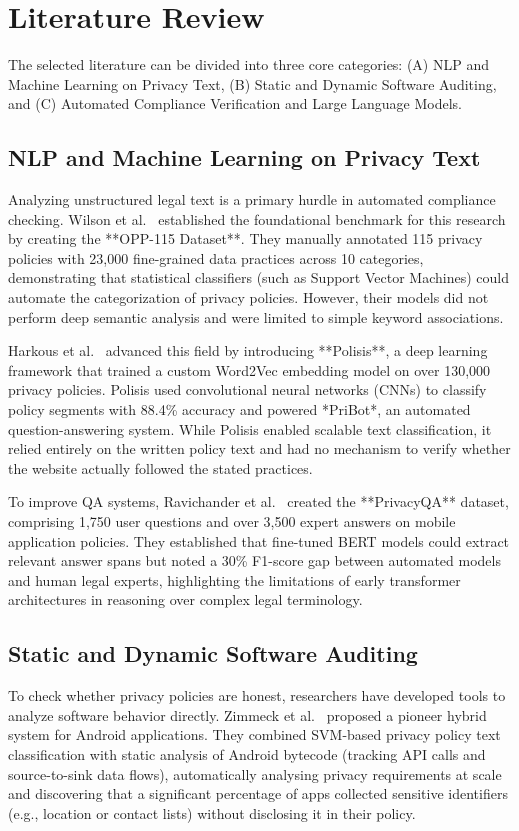 \documentclass[11pt,a4paper]{article}
\begin{document}
\section{Literature Review}
The selected literature can be divided into three core categories: (A) NLP and Machine Learning on Privacy Text, (B) Static and Dynamic Software Auditing, and (C) Automated Compliance Verification and Large Language Models.

\subsection{NLP and Machine Learning on Privacy Text}
Analyzing unstructured legal text is a primary hurdle in automated compliance checking. Wilson et al.~\cite{wilson-2016-opp115} established the foundational benchmark for this research by creating the **OPP-115 Dataset**. They manually annotated 115 privacy policies with 23,000 fine-grained data practices across 10 categories, demonstrating that statistical classifiers (such as Support Vector Machines) could automate the categorization of privacy policies. However, their models did not perform deep semantic analysis and were limited to simple keyword associations.

Harkous et al.~\cite{harkous-2018-polisis} advanced this field by introducing **Polisis**, a deep learning framework that trained a custom Word2Vec embedding model on over 130,000 privacy policies. Polisis used convolutional neural networks (CNNs) to classify policy segments with 88.4\% accuracy and powered *PriBot*, an automated question-answering system. While Polisis enabled scalable text classification, it relied entirely on the written policy text and had no mechanism to verify whether the website actually followed the stated practices.

To improve QA systems, Ravichander et al.~\cite{ravichander-2019-privacyqa} created the **PrivacyQA** dataset, comprising 1,750 user questions and over 3,500 expert answers on mobile application policies. They established that fine-tuned BERT models could extract relevant answer spans but noted a 30\% F1-score gap between automated models and human legal experts, highlighting the limitations of early transformer architectures in reasoning over complex legal terminology.

\subsection{Static and Dynamic Software Auditing}
To check whether privacy policies are honest, researchers have developed tools to analyze software behavior directly. Zimmeck et al.~\cite{zimmeck-2017-mobileapps} proposed a pioneer hybrid system for Android applications. They combined SVM-based privacy policy text classification with static analysis of Android bytecode (tracking API calls and source-to-sink data flows), automatically analysing privacy requirements at scale and discovering that a significant percentage of apps collected sensitive identifiers (e.g., location or contact lists) without disclosing it in their policy.
\end{document}
